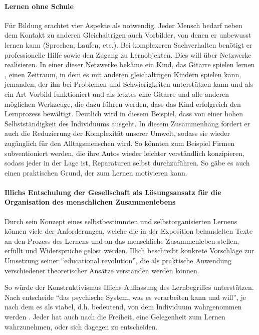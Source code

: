 \paragraph{Lernen ohne Schule}

Für Bildung erachtet \citeauthor{Illich-1971} vier Aspekte als notwendig.
Jeder Mensch bedarf neben dem Kontakt zu anderen Gleichaltrigen auch Vorbilder, von denen er unbewusst lernen kann (Sprechen, Laufen, etc.).
Bei komplexeren Sachverhalten benötigt er professionelle Hilfe sowie den Zugang zu Lernobjekten.
Dies will \citeauthor{Illich-1971} über Netzwerke realisieren.
In einer dieser Netzwerke bekäme ein Kind, das Gitarre spielen lernen \emph, einen Zeitraum, in dem es mit anderen gleichaltrigen Kindern spielen kann, jemanden, der ihn bei Problemen und Schwierigkeiten unterstützen kann und als ein Art Vorbild funktioniert und als letztes eine Gitarre und alle anderen möglichen Werkzeuge, die dazu führen werden, dass das Kind erfolgreich den Lernprozess bewältigt.
Deutlich wird in diesem Beispiel, dass \citeauthor{Illich-1971} von einer hohen Selbstständigkeit des Individuums ausgeht.
In diesem Zusammenhang fordert er auch die Reduzierung der Komplexität unserer Umwelt, sodass sie wieder zugänglich für den Alltagsmenschen wird.
So könnten zum Beispiel Firmen subventioniert werden, die ihre Autos wieder leichter verständlich konzipieren, sodass jeder in der Lage ist, Reparaturen selbst durchzuführen.
So gäbe es auch einen praktischen Grund, der zum Lernen motivieren kann.


\paragraph{Illichs Entschulung der Gesellschaft als Lösungsansatz für die Organisation des menschlichen Zusammenlebens}

Durch sein Konzept eines selbstbestimmten und selbstorganisierten Lernens können viele der Anforderungen, welche die in der Exposition behandelten Texte an den Prozess des Lernens und an das menschliche Zusammenleben stellen, erfüllt und Widersprüche gelöst werden.
Illich beschreibt konkrete Vorschläge zur Umsetzung seiner ``educational revolution'', die als praktische Anwendung verschiedener theoretischer Ansätze verstanden werden können.

So würde der Konstruktivismus Illichs Auffassung des Lernbegriffes unterstützen.
Nach \citeauthor{siebert-2003} entscheide ``das psychische System, was es verarbeiten kann und will'', je nach dem es als viabel, d.h. bedeutend, von dem Individuum wahrgenommen werden \parencite[13]{siebert-2003}.
Jeder hat auch nach \citeauthor{Illich-1971} die Freiheit, eine Gelegenheit zum Lernen wahrzunehmen, oder sich dagegen zu entscheiden.

